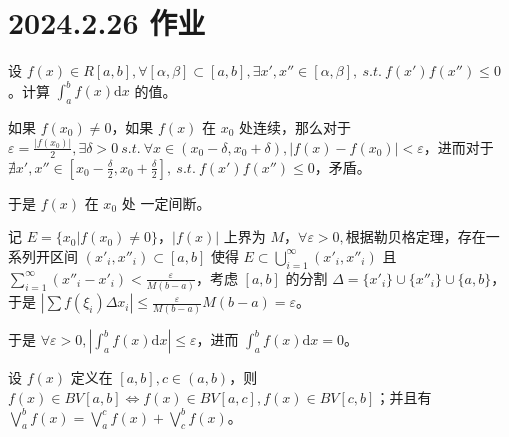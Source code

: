 \ifx\allfiles\undefined

\date{}
\author{尹锦润}

\maketitle
\fi

\section{2024.2.26 作业}

\begin{ques}
	设 $\displaystyle f( x) \in R[ a,b] ,\forall [ \alpha ,\beta ] \subset [ a,b] ,\exists x',x''\in [ \alpha ,\beta ] ,\ s.t.\ f( x') f( x'') \leqslant 0$。计算 $\displaystyle \int _{a}^{b} f( x)\mathrm{d} x$ 的值。
\end{ques}



如果 $\displaystyle f( x_{0}) \neq 0$，如果 $\displaystyle f( x)$ 在 $\displaystyle x_{0}$ 处连续，那么对于 $\displaystyle \varepsilon =\frac{|f( x_{0}) |}{2} ,\exists \delta  >0\ s.t.\ \forall x\in ( x_{0} -\delta ,x_{0} +\delta ) ,|f( x) -f( x_{0}) |< \varepsilon $，进而对于 $\displaystyle \nexists x',x''\in \left[ x_{0} -\frac{\delta }{2} ,x_{0} +\frac{\delta }{2}\right] ,\ s.t.\ f( x') f( x'') \leqslant 0$，矛盾。

于是 $\displaystyle f( x)$ 在 $\displaystyle x_{0}$ 处 一定间断。

记 $\displaystyle E=\{x_{0} | f( x_{0}) \neq 0\}$，$\displaystyle |f( x)|$ 上界为 $\displaystyle M$，$\displaystyle \forall \varepsilon  >0,$根据勒贝格定理，存在一系列开区间 $\displaystyle ( x'_{i} ,x''_{i}) \subset [ a,b]$ 使得 $\displaystyle E\subset \bigcup _{i=1}^{\infty }( x '_{i} ,x''_{i})$ 且 $\displaystyle \sum _{i=1}^{\infty }( x''_{i} -x'_{i}) < \frac{\varepsilon }{M( b-a)}$，考虑 $\displaystyle [ a,b]$ 的分割 $\displaystyle \Delta =\{x'_{i}\} \cup \{x''_{i}\} \cup \{a,b\}$，于是 $\displaystyle \left| \sum f( \xi _{i}) \Delta x_{i}\right| \leqslant \frac{\varepsilon }{M( b-a)} M( b-a) =\varepsilon $。

于是 $\displaystyle \forall \varepsilon  >0,\left| \int _{a}^{b} f( x)\mathrm{d} x\right| \leqslant \varepsilon $，进而 $\displaystyle \int _{a}^{b} f( x)\mathrm{d} x=0$。





\begin{ques}
	设 $\displaystyle f( x)$ 定义在 $\displaystyle [ a,b] ,c\in ( a,b)$，则 $\displaystyle f( x) \in BV[ a,b] \Leftrightarrow f( x) \in BV[ a,c] ,f( x) \in BV[ c,b]$；并且有 $\displaystyle \bigvee _{a}^{b} f( x) =\bigvee _{a}^{c} f( x) +\bigvee _{c}^{b} f( x)$。

\end{ques}



